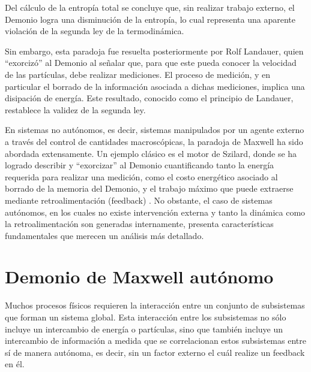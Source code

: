 Del cálculo de la entropía total se concluye que, sin realizar trabajo externo, el Demonio logra una disminución de la entropía, lo cual representa una aparente violación de la segunda ley de la termodinámica.

Sin embargo, esta paradoja fue resuelta posteriormente por Rolf Landauer, quien ``exorcizó'' al Demonio al señalar que, para que este pueda conocer la velocidad de las partículas, debe realizar mediciones. El proceso de medición, y en particular el borrado de la información asociada a dichas mediciones, implica una disipación de energía. Este resultado, conocido como el principio de Landauer, restablece la validez de la segunda ley\cite{Landauer_1961}.

En sistemas no autónomos, es decir, sistemas manipulados por un agente externo a través del control de cantidades macroscópicas, la paradoja de Maxwell ha sido abordada extensamente. Un ejemplo clásico es el motor de Szilard\cite{szilard1964decrease}, donde se ha logrado describir y ``exorcizar'' al Demonio cuantificando tanto la energía requerida para realizar una medición,  como el costo energético asociado al borrado de la memoria del Demonio, y el trabajo máximo que puede extraerse mediante retroalimentación (feedback) \cite{maruyama2009colloquium, sagawa2008second}. No obstante, el caso de sistemas autónomos, en los cuales no existe intervención externa y tanto la dinámica como la retroalimentación son generadas internamente, presenta características fundamentales que merecen un análisis más detallado.


\label{sec4:Demon}

\section{Demonio de Maxwell autónomo}
Muchos procesos físicos requieren la interacción entre un conjunto de subsistemas que forman un sistema global. Esta interacción entre los subsistemas no sólo incluye un intercambio de energía o partículas, sino que también incluye un intercambio de información a medida que se correlacionan estos subsistemas entre sí de manera autónoma, es decir, sin un factor externo el cuál realize un feedback en él.

